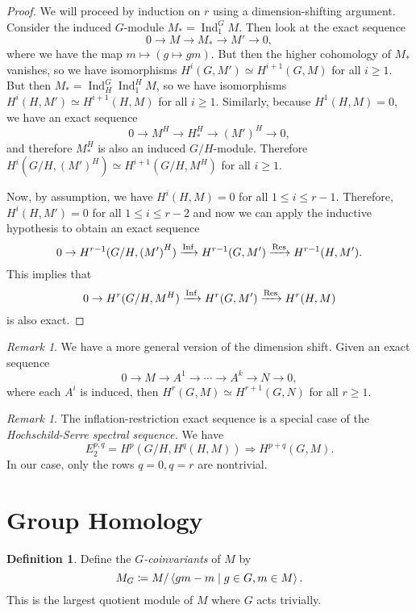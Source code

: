 \documentclass[leqno, openany]{memoir}
\theoremstyle{definition}
\newtheorem{defn}[thm]{Definition}
\theoremstyle{remark}
\newtheorem{rmk}[thm]{Remark}
\theoremstyle{plain}
\theoremstyle{definition}
\theoremstyle{remark}
\DeclareMathOperator{\Ind}{Ind}
\DeclareMathOperator{\Inf}{Inf}
\begin{document}
\begin{proof}
    We will proceed by induction on $r$ using a dimension-shifting argument. Consider the induced $G$-module $M_* = \Ind_1^G M$. Then look at the exact sequence
    \[ 0 \to M \to M_* \to M' \to 0, \]
    where we have the map $m \mapsto (g \mapsto gm)$. But then the higher cohomology of $M_*$ vanishes, so we have isomorphisms $H^i(G, M') \simeq H^{i+1}(G, M)$ for all $i \geq 1$. But then $M_* = \Ind_H^G \Ind_1^H M$, so we have isomorphisms $H^i(H, M') \simeq H^{i+1}(H, M)$ for all $i \geq 1$. Similarly, because $H^1(H, M) = 0$, we have an exact sequence
    \[ 0 \to M^H \to H_*^H \to {(M')}^H \to 0, \]
    and therefore $M_*^H$ is also an induced $G/H$-module. Therefore $H^i(G/H, {(M')}^H) \simeq H^{i+1}(G/H, M^H)$ for all $i \geq 1$.

    Now, by assumption, we have $H^i(H, M) = 0$ for all $1 \leq i \leq r-1$. Therefore, $H^i(H, M') = 0$ for all $1 \leq i \leq r-2$ and now we can apply the inductive hypothesis to obtain an exact sequence
    \[ 0 \to H^{r-1}(G/H, {(M')}^H) \xrightarrow{\Inf} H^{r-1}(G, M') \xrightarrow{\Res} H^{r-1}(H, M'). \]
    This implies that
    \[ 0 \to H^r(G/H, M^H) \xrightarrow{\Inf} H^r(G, M') \xrightarrow{\Res} H^r(H, M) \]
    is also exact.
\end{proof}

\begin{rmk}
    We have a more general version of the dimension shift. Given an exact sequence
    \[ 0 \to M \to A^1 \to \cdots \to A^k \to N \to 0, \]
    where each $A^i$ is induced, then $H^r(G, M) \simeq H^{r+1}(G, N)$ for all $r \geq 1$.
\end{rmk}

\begin{rmk}
    The inflation-restriction exact sequence is a special case of the \textit{Hochschild-Serre spectral sequence.} We have
    \[ E_2^{p,q} = H^p(G/H, H^q(H, M)) \Rightarrow H^{p+q}(G, M). \]
    In our case, only the rows $q = 0, q = r$ are nontrivial.
\end{rmk}

\section{Group Homology}%
\label{sec:group_homology}

\begin{defn}
    Define the \textit{$G$-coinvariants} of $M$ by 
    \[ M_G \coloneqq M / \ev{gm - m \mid g \in G, m \in M}. \]
    This is the largest quotient module of $M$ where $G$ acts trivially.
\end{defn}
\end{document}
